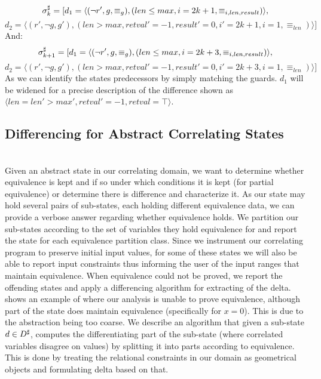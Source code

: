{\footnotesize
\[
\sigma^\sharp_{k} = [ d_1 = \langle (\neg r',g,\equiv_{g}),(len \leq max, i = 2k + 1, \equiv_{i,len,result}) \rangle,
\]
\[
d_2 = \langle (r',\neg g,g'),
(len > max, retval' = -1, result' = 0, i' = 2k + 1, i = 1, \equiv_{len}) \rangle ]
\]
}
{\footnotesize
And:
\[
\sigma^\sharp_{k+1} = [ d_1 = \langle (\neg r',g,\equiv_{g}),(len \leq max, i = 2k + 3, \equiv_{i,len,result}) \rangle,
\]
\[
d_2 = \langle (r',\neg g,g'),
(len > max, retval' = -1, result' = 0, i' = 2k + 3, i = 1, \equiv_{len}) \rangle ]
\]
}
As we can identify the states predecessors by simply matching the guards. $d_1$ will be widened for a precise description of the difference shown as $\langle len = len' > max', retval' = -1, retval = \top \rangle$.

\subsection{Differencing for Abstract Correlating States} 
\\
Given an abstract state in our correlating domain, we want to determine whether equivalence is kept and if so under which conditions it is kept (for partial equivalence) or determine there is difference and characterize it. As our state may hold several pairs of sub-states, each holding different equivalence data, we can provide a verbose answer regarding whether equivalence holds. We partition our sub-states according to the set of variables they hold equivalence for and report the state for each equivalence partition class. Since we instrument our correlating program to preserve initial input values, for some of these states we will also be able to report input constraints thus informing the user of the input ranges that maintain equivalence. When equivalence could not be proved, we report the offending states and apply a differencing algorithm for extracting of the delta.  shows an example of where our analysis is unable to prove equivalence, although part of the state does maintain equivalence (specifically for $x=0$). This is due to the abstraction being too coarse. We describe an algorithm that given a sub-state $d \in D^\sharp$, computes the differentiating part of the sub-state (where correlated variables disagree on values) by splitting it into parts according to equivalence. This is done by treating the relational constraints in our domain as geometrical objects and formulating delta based on that.

